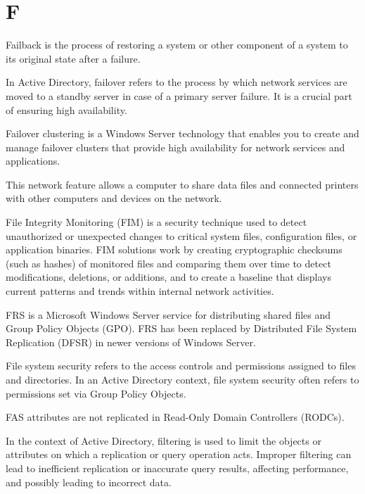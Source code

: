 \section*{F}
 Failback is the process of restoring a system or other component of a system to its original state after a failure.

 In Active Directory, failover refers to the process by which network services are moved to a standby server in case of a primary server failure. It is a crucial part of ensuring high availability.

 Failover clustering is a Windows Server technology that enables you to create and manage failover clusters that provide high availability for network services and applications.

 This network feature allows a computer to share data files and connected printers with other computers and devices on the network.

 File Integrity Monitoring (FIM) is a security technique used to detect unauthorized or unexpected changes to critical system files, configuration files, or application binaries. FIM solutions work by creating cryptographic checksums (such as hashes) of monitored files and comparing them over time to detect modifications, deletions, or additions, and to create a baseline that displays current patterns and trends within internal network activities.

 FRS is a Microsoft Windows Server service for distributing shared files and Group Policy Objects (GPO). FRS has been replaced by Distributed File System Replication (DFSR) in newer versions of Windows Server.

 File system security refers to the access controls and permissions assigned to files and directories. In an Active Directory context, file system security often refers to permissions set via Group Policy Objects.

 FAS attributes are not replicated in Read-Only Domain Controllers (RODCs).

 In the context of Active Directory, filtering is used to limit the objects or attributes on which a replication or query operation acts. Improper filtering can lead to inefficient replication or inaccurate query results, affecting performance, and possibly leading to incorrect data.


